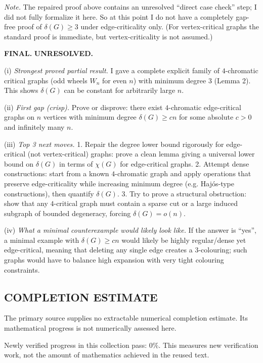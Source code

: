 \medskip
\emph{Note.} The repaired proof above contains an unresolved ``direct case check'' step; I did not fully formalize it here.
So at this point I do not have a completely gap-free proof of $\delta(G)\ge 3$ under edge-criticality only.
(For vertex-critical graphs the standard proof is immediate, but vertex-criticality is not assumed.)

\textbf{FINAL.} \textbf{UNRESOLVED.}

(i) \emph{Strongest proved partial result.} I gave a complete explicit family of $4$-chromatic critical graphs (odd wheels $W_n$ for even $n$) with minimum degree $3$ (Lemma 2). This shows $\delta(G)$ can be constant for arbitrarily large $n$.

(ii) \emph{First gap (crisp).} Prove or disprove: there exist $4$-chromatic edge-critical graphs on $n$ vertices with minimum degree $\delta(G)\ge cn$ for some absolute $c>0$ and infinitely many $n$.

(iii) \emph{Top 3 next moves.}
1. Repair the degree lower bound rigorously for edge-critical (not vertex-critical) graphs: prove a clean lemma giving a universal lower bound on $\delta(G)$ in terms of $\chi(G)$ for edge-critical graphs.
2. Attempt dense constructions: start from a known $4$-chromatic graph and apply operations that preserve edge-criticality while increasing minimum degree (e.g. Haj\'os-type constructions), then quantify $\delta(G)$.
3. Try to prove a structural obstruction: show that any $4$-critical graph must contain a sparse cut or a large induced subgraph of bounded degeneracy, forcing $\delta(G)=o(n)$.

(iv) \emph{What a minimal counterexample would likely look like.} If the answer is ``yes'', a minimal example with $\delta(G)\ge cn$ would likely be highly regular/dense yet edge-critical, meaning that deleting any single edge creates a 3-colouring; such graphs would have to balance high expansion with very tight colouring constraints.




\subsection*{COMPLETION ESTIMATE}
The primary source supplies no extractable numerical completion estimate. Its mathematical progress is not numerically assessed here.

Newly verified progress in this collection pass: $0\%$. This measures new verification work, not the amount of mathematics achieved in the reused text.
